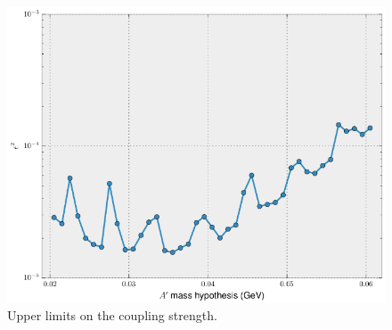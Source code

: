 \begin{figure}[ht]
    \centering
    \includegraphics[width=\textwidth]{images/final_coupling_upper_limits.png}
    \caption{Upper limits on the coupling strength.}
    \label{fig:epsilon_upper_limit}
\end{figure}





